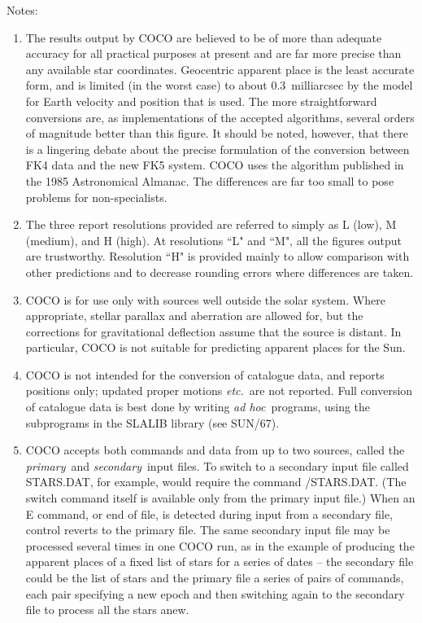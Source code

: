 Notes:
\begin{enumerate}
\item The results output by COCO are believed to be of more
than adequate accuracy for all practical purposes at
present and are far more precise than any
available star coordinates.
Geocentric apparent place
is the least accurate form,
and is limited (in the worst case) to about 0.3~milliarcsec
by the model for Earth velocity and position that is
used.
The more straightforward conversions are, as
implementations of the accepted algorithms, several
orders of magnitude better than this figure.
It should
be noted, however, that there is a lingering debate
about the precise formulation of the conversion between
FK4 data and the new FK5 system. COCO uses the algorithm
published in the 1985 Astronomical Almanac.
The differences are far too small to pose problems for non-specialists.
\item The three report resolutions provided are referred
to simply as L (low), M (medium),
and H (high).
At resolutions ``L" and ``M", all the
figures output are trustworthy.
Resolution ``H" is provided
mainly to allow comparison with other predictions and to
decrease rounding errors where differences are taken.
\item COCO is for use only with sources well outside the solar
system.
Where appropriate, stellar parallax and aberration
are allowed for, but the corrections for gravitational
deflection assume that the source is distant.
In particular, COCO is not suitable for predicting apparent places
for the Sun.
\item COCO is not intended for the conversion of catalogue data,
and reports positions only; updated proper motions {\it etc.}\
are not reported.
Full conversion of catalogue data is best done by writing
{\it ad hoc}\, programs, using the subprograms in the SLALIB
library (see SUN/67).
\item COCO accepts both commands and data from up to two
sources, called the {\it primary}\, and {\it secondary}\ input files.
To switch to a secondary input file called STARS.DAT, for
example, would require the command /STARS.DAT.
(The switch command itself is available only from the primary input file.) 
When an E command, or end of file, is detected during input from
a secondary file, control reverts to the primary file.
The same secondary input file may be processed several times in
one COCO run, as in the example of producing the apparent places of
a fixed list of stars for a series of dates -- the secondary file
could be the list of stars and the primary file a series of pairs of
commands, each pair specifying a new epoch and then switching again
to the secondary file to process all the stars anew.
\end{enumerate}

